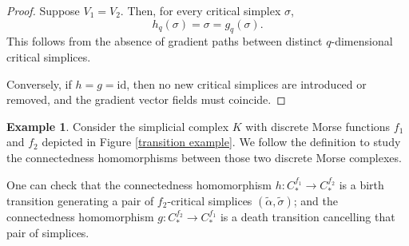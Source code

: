 \documentclass[a4paper,12pt,notitlepage]{amsart}
\theoremstyle{definition}%
\newtheorem{example}[theorem]{Example}
\theoremstyle{definition}%
\theoremstyle{definition}%
\begin{document}
\begin{proof}
Suppose $V_1 = V_2$. 
Then, for every critical simplex $\sigma$, 
$$h_q(\sigma) = \sigma = g_q(\sigma).$$
This follows from the absence of gradient paths between 
distinct $q$-dimensional critical simplices.

Conversely, if $h = g = \mathrm{id}$, then no new critical simplices are introduced or removed, and the gradient vector fields must coincide.
\end{proof}





\begin{example}
Consider the simplicial complex $K$ with discrete Morse functions $f_1$ and $f_2$ depicted in Figure \ref{transition example}.
We follow the definition to study the connectedness homomorphisms between those two 
discrete Morse complexes.

One can check that the connectedness homomorphism 
$h: C_{\ast}^{f_1} \to C_{\ast}^{f_2}$
is a birth transition
generating 
a pair of $f_2$-critical simplices $(\tilde{\alpha}, \tilde{\sigma})$;
and 
the connectedness homomorphism 
$g: C_{\ast}^{f_2} \to C_{\ast}^{f_1}$
is a death transition
cancelling that pair of simplices.

\begin{figure}[h!]


\begin{minipage}{.5\textwidth}



\end{minipage}
\end{figure}
\end{example}
\end{document}
